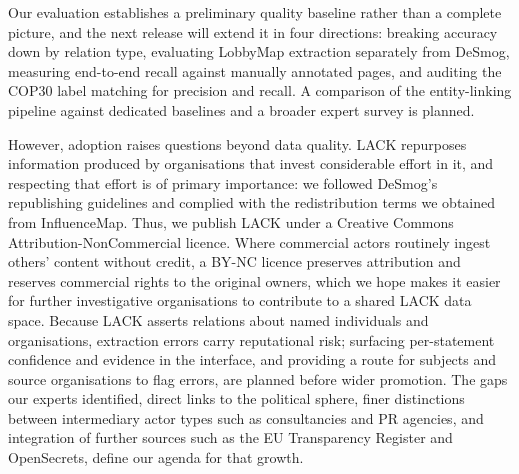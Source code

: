 \begin{sloppypar}
Our evaluation establishes a preliminary quality baseline rather than a complete picture, and the next release will extend it in four directions: breaking accuracy down by relation type, evaluating LobbyMap extraction separately from DeSmog, measuring end-to-end recall against manually annotated pages, and auditing the COP30 label matching for precision and recall.
A comparison of the entity-linking pipeline against dedicated baselines and a broader expert survey is planned.

However, adoption raises questions beyond data quality. 
LACK repurposes information produced by organisations that invest considerable effort in it, and respecting that effort is of primary importance: we followed DeSmog's republishing guidelines and complied with the redistribution terms we obtained from InfluenceMap.
Thus, we publish LACK under a Creative Commons Attribution-NonCommercial licence.
Where commercial actors routinely ingest others' content without credit, a BY-NC licence preserves attribution and reserves commercial rights to the original owners, which we hope makes it easier for further investigative organisations to contribute to a shared LACK data space.
Because LACK asserts relations about named individuals and organisations, extraction errors carry reputational risk; surfacing per-statement confidence and evidence in the interface, and providing a route for subjects and source organisations to flag errors, are planned before wider promotion.
The gaps our experts identified, direct links to the political sphere, finer distinctions between intermediary actor types such as consultancies and PR agencies, and integration of further sources such as the EU Transparency Register and OpenSecrets, define our agenda for that growth.



\end{sloppypar}
